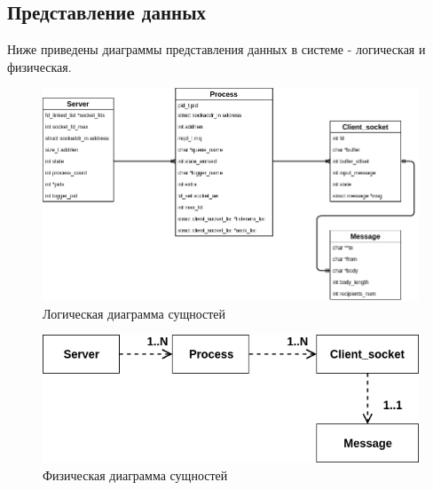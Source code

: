 \documentclass[a4paper,12pt]{report}
\begin{document}
\subsection*{Представление данных}
Ниже приведены диаграммы представления данных в системе - логическая и физическая.

\begin{figure}
\centering
\includegraphics[width=\textwidth]{static/Server_Class_Diagram.png}
\caption{Логическая диаграмма сущностей}
\label{fig:logic_diagram}
\end{figure}

\begin{figure}
\centering
\includegraphics[width=\textwidth]{static/Physical_data.png}
\caption{Физическая диаграмма сущностей}
\label{fig:phys_diagram}
\end{figure}
\end{document}
